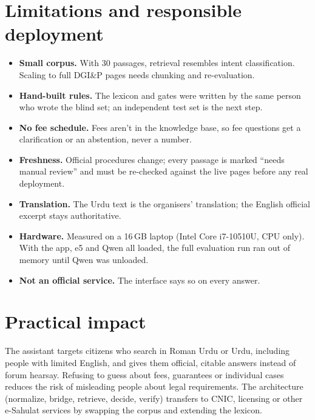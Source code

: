 \documentclass[11pt,a4paper]{article}
\begin{document}
\section{Limitations and responsible deployment}
\begin{itemize}
  \item \textbf{Small corpus.} With 30 passages, retrieval resembles intent classification. Scaling to full DGI\&P pages needs
        chunking and re-evaluation.
  \item \textbf{Hand-built rules.} The lexicon and gates were written by the same person who wrote the blind set; an
        independent test set is the next step.
  \item \textbf{No fee schedule.} Fees aren't in the knowledge base, so fee questions get a clarification or an abstention,
        never a number.
  \item \textbf{Freshness.} Official procedures change; every passage is marked ``needs manual review'' and must be
        re-checked against the live pages before any real deployment.
  \item \textbf{Translation.} The Urdu text is the organisers' translation; the English official excerpt stays authoritative.
  \item \textbf{Hardware.} Measured on a 16\,GB laptop (Intel Core i7-10510U, CPU only). With the app, e5 and Qwen all
        loaded, the full evaluation run ran out of memory until Qwen was unloaded.
  \item \textbf{Not an official service.} The interface says so on every answer.
\end{itemize}

\section{Practical impact}
The assistant targets citizens who search in Roman Urdu or Urdu, including people with limited English, and gives them
official, citable answers instead of forum hearsay. Refusing to guess about fees, guarantees or individual cases reduces the
risk of misleading people about legal requirements. The architecture (normalize, bridge, retrieve, decide, verify) transfers to
CNIC, licensing or other e-Sahulat services by swapping the corpus and extending the lexicon.
\end{document}
